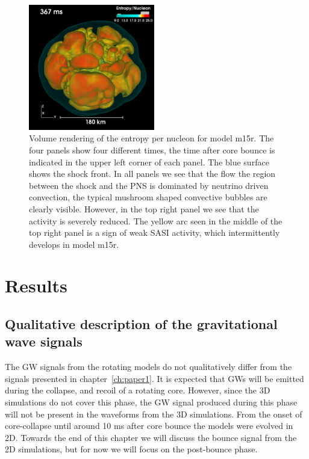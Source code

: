 \begin{figure}[ht]
\includegraphics[width=0.49\textwidth]{./images/paper2/m15r4.png}
\caption{ Volume rendering of the entropy per nucleon for model m15r. The four panels show four different times,
the time after core bounce is indicated in the upper left corner of each panel. 
The blue surface shows the shock front. In all panels we see that the flow the region between the shock and the PNS
is dominated by neutrino driven convection, the typical mushroom shaped convective bubbles are clearly visible.
However, in the top right panel we see that the activity is severely reduced. The yellow arc seen in the middle of the top right
panel is a sign of weak SASI activity, which intermittently develops in model m15r. 
\label{figp2:3dpics2}}
\end{figure}

\section{Results}
\subsection{Qualitative description of the gravitational wave signals}
{\comment The GW signals from the rotating models do not qualitatively differ from the signals presented in chapter~\ref{ch:paper1}. 
It is expected that GWs will be emitted during the collapse, and recoil of a rotating core. However, since the 3D simulations do not cover this phase, 
the GW signal produced during this phase will not be present in the waveforms from the 3D simulations.  From the onset of core-collapse until around 10 
ms after core bounce the models were evolved in 2D.
Towards the end of this chapter we will discuss the bounce signal from the 2D simulations, but for now we will focus on the post-bounce phase.}

